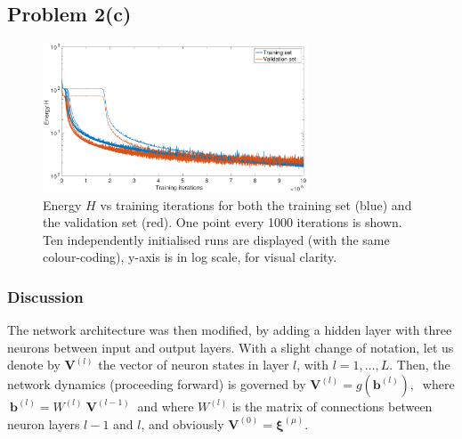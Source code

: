 \documentclass[12pt,titlepage]{article}
\begin{document}
\clearpage

\subsection*{Problem 2(c)}
\vspace*{-0.3cm}
\begin{figure}[H]
\centering
\includegraphics[width=0.7\textwidth]{../Figures/oneHL_energy.pdf}
\caption{\footnotesize Energy $H$ vs training iterations for both the training set (blue) and the validation set (red). One point every 1000 iterations is shown. Ten independently initialised runs are displayed (with the same colour-coding), y-axis is in log scale, for visual clarity.}
\label{fig:2c}
\end{figure}

\vspace*{-0.3cm}
\subsubsection*{Discussion}
\vspace*{-0.2cm}
The network architecture was then modified, by adding a hidden layer with three neurons between input and output layers. With a slight change of notation, let us denote by $\bm{V}^{(l)}$ the vector of neuron states in layer $l$, with $l = 1,\ldots,L$. Then, the network dynamics (proceeding forward) is governed by $\bm{V}^{(l)} = g(\bm{b}^{(l)}), \ $ where $\ \bm{b}^{(l)} = W^{(l)} \ \bm{V}^{(l-1)}\ $ and where $W^{(l)}$ is the matrix of connections between neuron layers $l-1$ and $l$, and obviously $\bm{V}^{(0)} = \bm{\xi}^{(\mu)}$.
\end{document}
